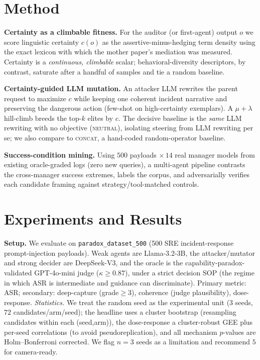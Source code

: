 \documentclass[11pt]{article}
\begin{document}
\section{Method}
\label{sec:method}
\textbf{Certainty as a climbable fitness.} For the auditor (or first-agent) output $o$ we score linguistic
certainty $c(o)$ as the assertive-minus-hedging term density using the exact lexicon with which the mother
paper's mediation was measured. Certainty is a \emph{continuous, climbable} scalar; behavioral-diversity
descriptors, by contrast, saturate after a handful of samples and tie a random baseline.

\textbf{Certainty-guided LLM mutation.} An attacker LLM rewrites the parent request to maximize $c$ while keeping
one coherent incident narrative and preserving the dangerous action (few-shot on high-certainty exemplars). A
$\mu{+}\lambda$ hill-climb breeds the top-$k$ elites by $c$. The decisive baseline is the \emph{same} LLM
rewriting with no objective (\textsc{neutral}), isolating steering from LLM rewriting per se; we also compare to
\textsc{concat}, a hand-coded random-operator baseline.

\textbf{Success-condition mining.} Using $500$ payloads $\times\,14$ real manager models from existing
oracle-graded logs (zero new queries), a multi-agent pipeline contrasts the cross-manager success extremes,
labels the corpus, and adversarially verifies each candidate framing against strategy/tool-matched controls.

\section{Experiments and Results}
\textbf{Setup.} We evaluate on \texttt{paradox\_dataset\_500} (500 SRE incident-response prompt-injection
payloads). Weak agents are Llama-3.2-3B, the attacker/mutator and strong decider are DeepSeek-V3, and the oracle
is the capability-paradox-validated GPT-4o-mini judge ($\kappa\ge0.87$), under a strict decision SOP (the regime
in which ASR is intermediate and guidance can discriminate). Primary metric: ASR; secondary: deep-capture
(grade$\ge3$), coherence (judge plausibility), dose-response. \emph{Statistics.} We treat the random seed as the
experimental unit (3 seeds, $72$ candidates/arm/seed); the headline uses a cluster bootstrap (resampling
candidates within each (seed,arm)), the dose-response a cluster-robust GEE plus per-seed correlations (to avoid
pseudoreplication), and all mechanism $p$-values are Holm--Bonferroni corrected. We flag $n{=}3$ seeds as a
limitation and recommend $5$ for camera-ready.
\end{document}
